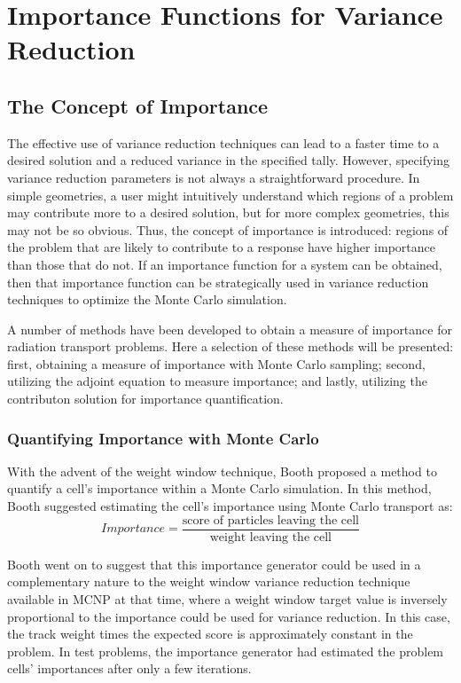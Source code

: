 \section{Importance Functions for Variance Reduction}
\label{sec:Importance}

\subsection{The Concept of Importance}
\label{sec:Importance}

The effective use of variance reduction techniques can lead to a faster time to
a desired solution and a reduced variance in the specified tally. However,
specifying variance reduction parameters is not always a straightforward
procedure. In simple geometries, a user might intuitively understand which
regions of a problem may contribute more to a desired solution, but for more
complex geometries, this may not be so obvious. Thus, the concept of importance
is introduced: regions of the problem that are likely to contribute to a
response have higher importance than those that do not. If an importance
function for a system can be obtained, then that importance function can be
strategically used in variance reduction techniques to optimize the Monte Carlo
simulation.

A number of methods have been developed to obtain a measure of importance for
radiation transport problems. Here a selection of these methods will be
presented: first, obtaining a measure of importance with Monte Carlo sampling;
second, utilizing the adjoint equation to measure importance; and lastly,
utilizing the contributon solution for importance quantification.

\subsubsection{Quantifying Importance with Monte Carlo}

With the advent of the weight window technique, Booth
\cite{booth_automatic_1982} proposed
a method to quantify a cell's importance within a Monte Carlo simulation. In
this method, Booth suggested estimating the cell's importance using Monte Carlo
transport as:
\begin{equation}
  Importance  = \frac{\text{score of particles leaving the cell}}
                     {\text{weight leaving the cell}}
\label{eq:BoothImp}
\end{equation}

Booth went on to suggest that this importance generator could be used in a
complementary nature to the weight window variance reduction technique available
in MCNP at that time, where a weight window target value is inversely
proportional to the importance could be used for variance reduction.
In this case, the track weight times the expected score is approximately
constant in the problem.
In test problems, the importance generator had estimated the problem cells'
importances after only a few iterations.

